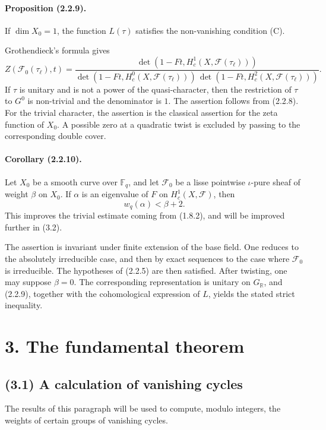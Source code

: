 \documentclass[11pt]{article}
\theoremstyle{remark}
\newcommand{\RR}{\mathbb{R}}
\newcommand{\Fq}{\mathbb{F}_q}
\begin{document}
\paragraph{Proposition (2.2.9).}
If \(\dim X_0=1\), the function \(L(\tau)\) satisfies the non-vanishing condition (C).

Grothendieck's formula gives
\[
Z(\mathcal F_0(\tau_\ell),t)=
\frac{\det(1-Ft,H^1_c(X,\mathcal F(\tau_\ell)))}
{\det(1-Ft,H^0_c(X,\mathcal F(\tau_\ell)))\,
 \det(1-Ft,H^2_c(X,\mathcal F(\tau_\ell)))} .
\]
If \(\tau\) is unitary and is not a power of the quasi-character, then the restriction of \(\tau\) to \(G^0\) is non-trivial and the denominator is \(1\). The assertion follows from (2.2.8). For the trivial character, the assertion is the classical assertion for the zeta function of \(X_0\). A possible zero at a quadratic twist is excluded by passing to the corresponding double cover.

\paragraph{Corollary (2.2.10).}
Let \(X_0\) be a smooth curve over \(\Fq\), and let \(\mathcal F_0\) be a lisse pointwise \(\iota\)-pure sheaf of weight \(\beta\) on \(X_0\). If \(\alpha\) is an eigenvalue of \(F\) on \(H^1_c(X,\mathcal F)\), then
\[
w_q(\alpha)<\beta+2.
\]
This improves the trivial estimate coming from (1.8.2), and will be improved further in (3.2).

The assertion is invariant under finite extension of the base field. One reduces to the absolutely irreducible case, and then by exact sequences to the case where \(\mathcal F_0\) is irreducible. The hypotheses of (2.2.5) are then satisfied. After twisting, one may suppose \(\beta=0\). The corresponding representation is unitary on \(G_\RR\), and (2.2.9), together with the cohomological expression of \(L\), yields the stated strict inequality.



\section*{3. The fundamental theorem}

\subsection*{(3.1) A calculation of vanishing cycles}

The results of this paragraph will be used to compute, modulo integers, the weights of certain groups of vanishing cycles.
\end{document}

